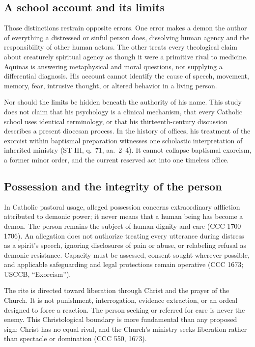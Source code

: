 \subsection{A school account and its limits}

Those distinctions restrain opposite errors. One error makes a demon the
author of everything a distressed or sinful person does, dissolving human
agency and the responsibility of other human actors. The other treats every
theological claim about creaturely spiritual agency as though it were a
primitive rival to medicine. Aquinas is answering metaphysical and moral
questions, not supplying a differential diagnosis. His account cannot identify
the cause of speech, movement, memory, fear, intrusive thought, or altered
behavior in a living person.

Nor should the limits be hidden beneath the authority of his name. This study
does not claim that his psychology is a clinical mechanism, that every Catholic
school uses identical terminology, or that his thirteenth-century discussion
describes a present diocesan process. In the history of offices, his treatment
of the exorcist within baptismal preparation witnesses one scholastic
interpretation of inherited ministry (ST III, q.~71, aa.~2--4). It cannot
collapse baptismal exorcism, a former minor order, and the current reserved act
into one timeless office.

\subsection{Possession and the integrity of the person}

In Catholic pastoral usage, alleged possession concerns extraordinary
affliction attributed to demonic power; it never means that a human being has
become a demon. The person remains the subject of human dignity and care (CCC
1700--1706). An allegation does not authorize treating every utterance during
distress as a spirit's speech, ignoring disclosures of pain or abuse, or
relabeling refusal as demonic resistance. Capacity must be assessed, consent
sought wherever possible, and applicable safeguarding and legal protections
remain operative (CCC 1673; USCCB, ``Exorcism'').

The rite is directed toward liberation through Christ and the prayer of the
Church. It is not punishment, interrogation, evidence extraction, or an ordeal
designed to force a reaction. The person seeking or referred for care is never
the enemy. This Christological boundary is more fundamental than any proposed
sign: Christ has no equal rival, and the Church's ministry seeks liberation
rather than spectacle or domination (CCC 550, 1673).

